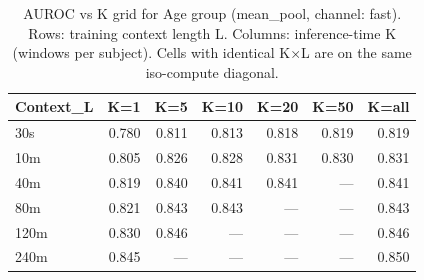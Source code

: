 \begin{table}[ht]
\centering
\caption{AUROC vs K grid for Age group (mean_pool, channel: fast). Rows: training context length L. Columns: inference-time K (windows per subject). Cells with identical K×L are on the same iso-compute diagonal.}
\label{tab:kgrid_age_class_mean_pool_fast}
\begin{tabular}{lrrrrrr}
\toprule
Context_L & K=1 & K=5 & K=10 & K=20 & K=50 & K=all \\
\midrule
30s & 0.780 & 0.811 & 0.813 & 0.818 & 0.819 & 0.819 \\
10m & 0.805 & 0.826 & 0.828 & 0.831 & 0.830 & 0.831 \\
40m & 0.819 & 0.840 & 0.841 & 0.841 & — & 0.841 \\
80m & 0.821 & 0.843 & 0.843 & — & — & 0.843 \\
120m & 0.830 & 0.846 & — & — & — & 0.846 \\
240m & 0.845 & — & — & — & — & 0.850 \\
\bottomrule
\end{tabular}
\end{table}